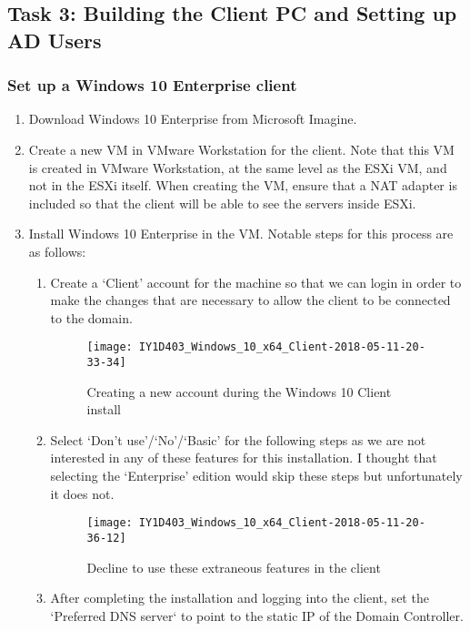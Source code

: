 \pagebreak
\subsection{Task 3: Building the Client PC and Setting up AD Users}
\subsubsection{Set up a Windows 10 Enterprise client}
\begin{enumerate}[series=task3methodology1]
  \item Download Windows 10 Enterprise from Microsoft Imagine.
  \item Create a new VM in VMware Workstation for the client. Note that this VM is created in VMware Workstation, at the same level as the ESXi VM, and not in the ESXi itself. When creating the VM, ensure that a NAT adapter is included so that the client will be able to see the servers inside ESXi.
  \item Install Windows 10 Enterprise in the VM. Notable steps for this process are as follows:
    \begin{enumerate}[label=(\alph*)]
      \item Create a `Client' account for the machine so that we can login in order to make the changes that are necessary to allow the client to be connected to the domain.
        \begin{figure}[H]
          \centering
          \captionsetup{skip=2pt}
          \texttt{[image: IY1D403\_Windows\_10\_x64\_Client-2018-05-11-20-33-34]}
          \caption{Creating a new account during the Windows 10 Client install}
          \label{fig:task3:win10client_01}
        \end{figure}
      \item Select `Don't use'/`No'/`Basic' for the following steps as we are not interested in any of these features for this installation. I thought that selecting the `Enterprise' edition would skip these steps but unfortunately it does not.
        \begin{figure}[H]
          \centering
          \captionsetup{skip=2pt}
          \texttt{[image: IY1D403\_Windows\_10\_x64\_Client-2018-05-11-20-36-12]}
          \caption{Decline to use these extraneous features in the client}
          \label{fig:task3:win10client_02}
        \end{figure}
      \item After completing the installation and logging into the client, set the `Preferred DNS server` to point to the static IP of the Domain Controller.

\end{enumerate}
\end{enumerate}
